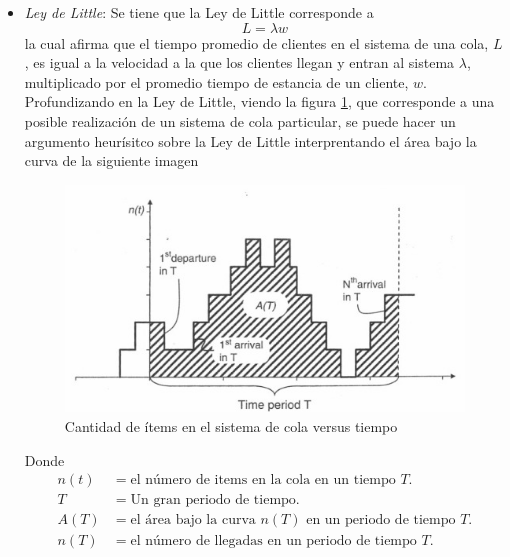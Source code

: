 \begin{itemize}
    \item \textit{Ley de Little}:
    \newline
    \noindent Se tiene que la Ley de Little corresponde a
    \begin{equation}
        L=\lambda w\label{eqll}
    \end{equation}
    la cual afirma que el tiempo promedio de clientes en el sistema de una cola, $L$, es igual a la velocidad a la que los clientes llegan y entran al sistema $\lambda$, multiplicado por el promedio tiempo de estancia de un cliente, $w$. %
    \newline\newline
    Profundizando en la Ley de Little, viendo la figura \ref{figll}, que corresponde a una posible realización de un sistema de cola particular, se puede hacer un argumento heur\'isitco sobre la Ley de Little interprentando el \'area bajo la curva de la siguiente imagen

    \begin{figure}[H]
        \centering
        \includegraphics[width=.75\textwidth]{images/littlelaw.jpeg}
        \caption{Cantidad de \'items en el sistema de cola versus tiempo \citep{johndclittle2008}}%
        \label{figll}
    \end{figure} 

    Donde
    \begin{align*}
        n(t) &= \text{el n\'umero de items en la cola en un tiempo $T$}.\\
        T &= \text{Un gran periodo de tiempo}. \\
        A(T) &= \text{el área bajo la curva $n(T)$ en un periodo de tiempo $T$}.\\
        n(T) &= \text{el n\'umero de llegadas en un periodo de tiempo $T$}.
    \end{align*}


\end{itemize}
